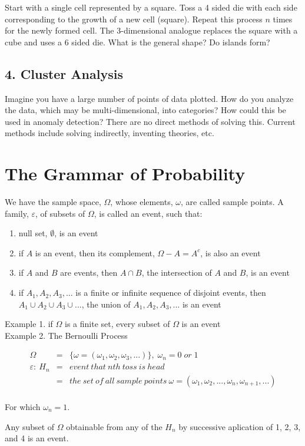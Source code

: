 Start with a single cell represented by a square.  Toss a 4 sided die with each side corresponding to the growth of a new cell (square).  Repeat this process $n$ times for the newly formed cell.  The 3-dimensional analogue replaces the square with a cube and uses a 6 sided die.  What is the general shape?  Do islands form?

\subsection{4.  Cluster Analysis}

Imagine you have a large number of points of data plotted.  How do you analyze the data, which may be multi-dimensional, into categories?  How could this be used in anomaly detection?  There are no direct methods of solving this.  Current methods include solving indirectly, inventing theories, etc.

\section{The Grammar of Probability}

We have the sample space, $\Omega$, whose elements, $\omega$, are called sample points.  A family, $\varepsilon$, of subsets of $\Omega$, is called an event, such that:

\begin{enumerate}
\item null set, $\emptyset$, is an event
\item if $A$ is an event, then its complement, $\Omega - A = A^c$, is also an event
\item if $A$ and $B$ are events, then $A \cap B$, the intersection of $A$ and $B$, is an event
\item if $A_1, A_2, A_3, ...$ is a finite or infinite sequence of disjoint events, then $A_1 \cup A_2 \cup A_3 \cup ...$, the union of $A_1, A_2, A_3, ...$ is an event
\end{enumerate}

Example 1.  if $\Omega$ is a finite set, every subset of $\Omega$ is an event\\
Example 2.  The Bernoulli Process

\begin{eqnarray*}
\Omega &=& \{ \omega = (\omega_1, \omega_2, \omega_3, ...)\}, \; \omega_n = 0 \; or \; 1\\
\varepsilon :\: H_n &=& event\:that\:nth\:toss\:is\:head\\
&=& the\:set\:of\:all\:sample\:points\:\omega = (\omega_1, \omega_2, ..., \omega_n, \omega_{n + 1}, ...)\\
\end{eqnarray*}

For which $\omega_n = 1$.

Any subset of $\Omega$ obtainable from any of the $H_n$ by successive aplication of 1, 2, 3, and 4 is an event.
